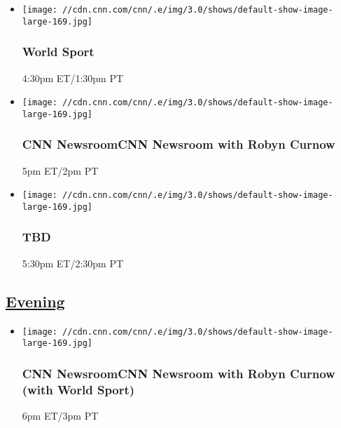 \begin{itemize}
\item
  \texttt{[image: //cdn.cnn.com/cnn/.e/img/3.0/shows/default-show-image-large-169.jpg]}

  \hypertarget{world-sport-7}{%
  \subsubsection{World Sport}\label{world-sport-7}}

  4:30pm ET/1:30pm PT
\end{itemize}

\begin{itemize}
\item
  \texttt{[image: //cdn.cnn.com/cnn/.e/img/3.0/shows/default-show-image-large-169.jpg]}

  \hypertarget{cnn-newsroomcnn-newsroom-with-robyn-curnow--2}{%
  \subsubsection{CNN NewsroomCNN Newsroom with Robyn Curnow
  }\label{cnn-newsroomcnn-newsroom-with-robyn-curnow--2}}

  5pm ET/2pm PT
\end{itemize}

\begin{itemize}
\item
  \texttt{[image: //cdn.cnn.com/cnn/.e/img/3.0/shows/default-show-image-large-169.jpg]}

  \hypertarget{tbd-4}{%
  \subsubsection{TBD}\label{tbd-4}}

  5:30pm ET/2:30pm PT
\end{itemize}

\hypertarget{evening--1}{%
\subsection{\texorpdfstring{\href{/tv/schedule/cnn/index.html}{Evening}~}{Evening~}}\label{evening--1}}

\begin{itemize}
\item
  \texttt{[image: //cdn.cnn.com/cnn/.e/img/3.0/shows/default-show-image-large-169.jpg]}

  \hypertarget{cnn-newsroomcnn-newsroom-with-robyn-curnow-with-world-sport-}{%
  \subsubsection{CNN NewsroomCNN Newsroom with Robyn Curnow (with World
  Sport)
  }\label{cnn-newsroomcnn-newsroom-with-robyn-curnow-with-world-sport-}}

  6pm ET/3pm PT
\end{itemize}

